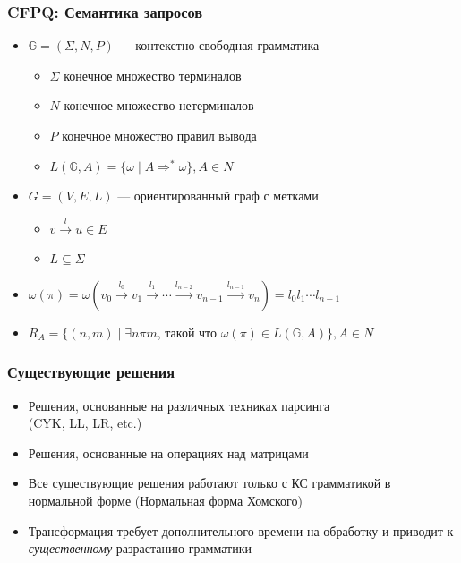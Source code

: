 \documentclass[xcolor=table,english,russian]{beamer}
\begin{document}
\begin{frame}[fragile] \frametitle{CFPQ: Семантика запросов}
    \begin{itemize}
        \item $\mathbb{G} = (\Sigma, N, P)$ --- контекстно-свободная грамматика
        \begin{itemize}
            \item $\Sigma$ конечное множество терминалов
            \item $N$ конечное множество нетерминалов
            \item $P$ конечное множество правил вывода
            \item $L(\mathbb{G},A) = \{ \omega \mid A \Rightarrow^* \omega \}, A \in N$
        \end{itemize}
        \item $G = (V,E,L)$ --- ориентированный граф с метками
        \begin{itemize}
            \item $v \xrightarrow{l} u \in E$
            \item $L \subseteq \Sigma$
        \end{itemize}
        \item $\omega(\pi) = \omega(v_0 \xrightarrow{l_0} v_1 \xrightarrow{l_1} \cdots \xrightarrow{l_{n-2}} v_{n-1} \xrightarrow{l_{n-1}} v_n) = l_0 l_1 \cdots l_{n-1}$
        \item $R_A = \{ (n, m) \mid \exists n \pi m$, такой что $\omega(\pi) \in L(\mathbb{G},A)\}, A \in N$
    \end{itemize}
\end{frame}

\begin{frame}[fragile] \frametitle{Существующие решения}
	\begin{itemize}
		\item Решения, основанные на различных техниках парсинга \\ (CYK, LL, LR, etc.)
		\item Решения, основанные на операциях над матрицами
		\item Все существующие решения работают только с КС грамматикой в нормальной форме (Нормальная форма Хомского)
		\item Трансформация требует дополнительного времени на обработку и приводит к \textit{существенному} разрастанию грамматики 
	\end{itemize}
\end{frame}
\end{document}
